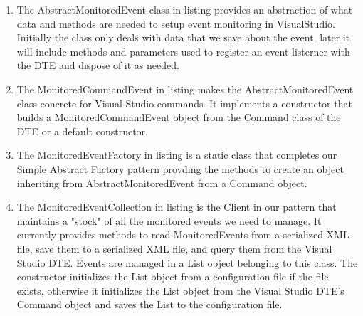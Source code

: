 \begin{enumerate}

\item
The AbstractMonitoredEvent class in listing %
 provides an abstraction of what data and methods are needed to setup event monitoring in VisualStudio.  Initially the class only deals with data that we save about the event, later it will include methods and parameters used to register an event listerner with the DTE and dispose of it as needed.
%

\item
The MonitoredCommandEvent in listing %
makes the AbstractMonitoredEvent class concrete for Visual Studio commands.  It implements a constructor that builds a MonitoredCommandEvent object from the Command class of the DTE or a default constructor.  
%

\item
The MonitoredEventFactory in listing %
 is a static class that completes our Simple Abstract Factory pattern provding the methods to create an object inheriting from AbstractMonitoredEvent from a Command object.  
%

\item
The MonitoredEventCollection in listing %
 is the Client in our pattern that maintains a "stock" of all the monitored events we need to manage.  It currently provides methods to read MonitoredEvents from a serialized XML file, save them to a serialized XML file, and query them from the Visual Studio DTE.  Events are managed in a List object belonging to this class.   The constructor initializes the List object from a configuration file if the file exists, otherwise it initializes the List object from the Visual Studio DTE's Command object and saves the List to the configuration file. 
%
\end{enumerate}


